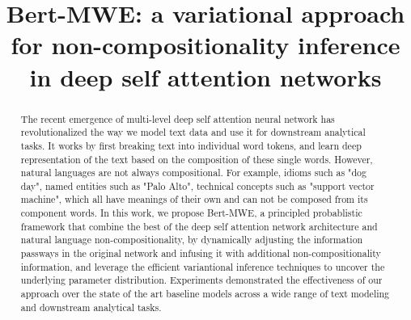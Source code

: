 \documentclass[conference]{IEEEtran}
\newcommand{\nop}[1]{}
\newcommand{\BertMWE}{\mbox{\sf Bert-MWE}\xspace}
\begin{document}
\title{
Bert-MWE: a variational approach for non-compositionality inference in deep self attention networks
}

\nop{
\author{Keqian Li, Hanwen Zha, Yu Su, Xifeng Yan}
\affiliation{\institution{University of California at Santa Barbara}}
\email{{klee, hwzha, ysu, xyan}@cs.ucsb.edu}

\renewcommand{\shortauthors}{K. Li et al.}
\renewcommand{\shorttitle}{UNEC}
}

\author{
}

\maketitle




\begin{abstract}
The recent emergence of multi-level deep self attention neural network has revolutionalized the way we model text data and use it for downstream analytical tasks. 
It works by first breaking text into individual word tokens, 
and learn deep representation of the text based on the composition of these single words.
However, natural languages are not always compositional.
For example, 
idioms such as "dog day", %
named entities such as "Palo Alto", 
technical concepts such as "support vector machine",
which all have meanings of their own and can not be composed from its component words.
In this work, 
we propose \BertMWE, a principled probablistic framework that combine the best of the deep self attention network architecture and natural language non-compositionality, 
by dynamically adjusting the information passways in the original network and infusing it with additional non-compositionality information,
and leverage the efficient variantional inference techniques to uncover the underlying parameter  distribution.
Experiments demonstrated the effectiveness of our approach over the state of the art baseline models across a wide range of text modeling and downstream analytical tasks.
\end{abstract}








\end{document}
